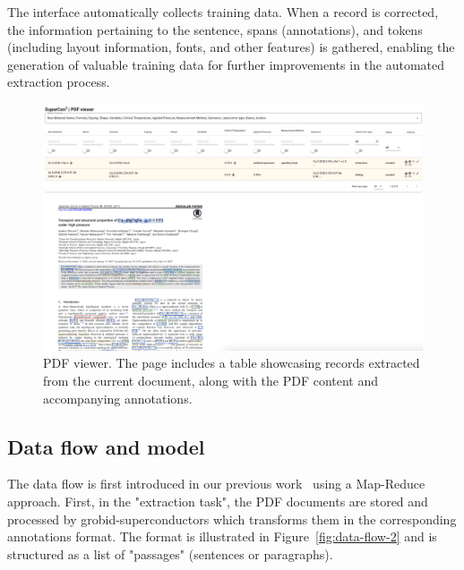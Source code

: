 \documentclass{article}
\begin{document}
The interface automatically collects training data. When a record is corrected, the information pertaining to the sentence, spans (annotations), and tokens (including layout information, fonts, and other features) is gathered, enabling the generation of valuable training data for further improvements in the automated extraction process.

\begin{figure}
  \centering
  \includegraphics[width=1\textwidth]{images/supercon-curation-pdf-viewer} 
  \caption{PDF viewer. The page includes a table showcasing records extracted from the  current document, along with the PDF content and accompanying annotations.}
  \label{fig:curation-interface-pdf-viewer}
\end{figure}


\subsection{Data flow and model}
\label{subsec:data-flow}

The data flow is first introduced in our previous work~\cite{lfoppiano2023automatic} using a Map-Reduce approach. 
First, in the "extraction task", the PDF documents are stored and processed by grobid-superconductors which transforms them in the corresponding annotations format. The format is illustrated in Figure~\ref{fig:data-flow-2} and is structured as a list of "passages" (sentences or paragraphs). 
\end{document}
